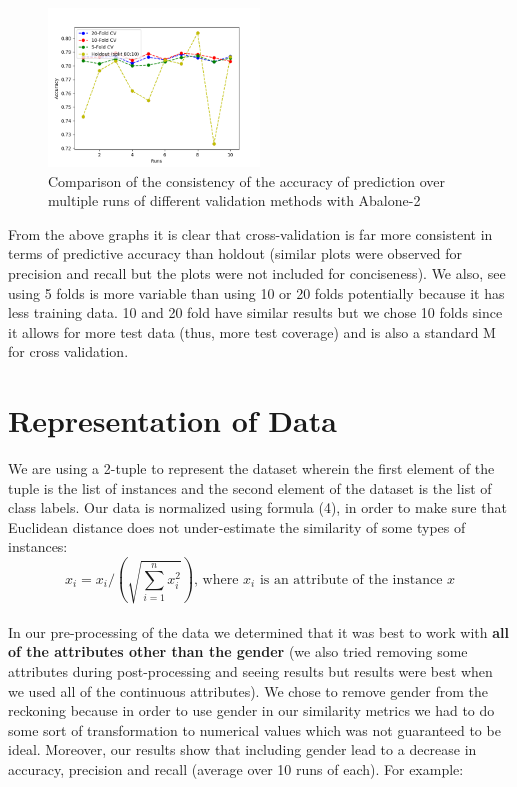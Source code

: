 \begin{figure}[!htb]
\centering

\includegraphics[width=0.5\textwidth]{consistency_comparison_2.png}
\caption{Comparison of the consistency of the accuracy of prediction over multiple runs of different validation methods with Abalone-2}
\end{figure}


From the above graphs it is clear that cross-validation is far more consistent in terms of predictive accuracy than holdout (similar plots were observed for precision and recall but the plots were not included for conciseness). We also, see using 5 folds is more variable than using 10 or 20 folds potentially because it has less training data. 10 and 20 fold have similar results but we chose 10 folds since it allows for more test data (thus, more test coverage) and is also a standard M for cross validation. 


\section{Representation of Data}

We are using a 2-tuple to represent the dataset wherein the first element of the tuple is the list of instances and the second element of the dataset is the list of class labels. Our data is normalized using formula (4), in order to make sure that Euclidean distance does not under-estimate the similarity of some types of instances:
\\
\begin{equation}
x_i = x_i/(\sqrt{\sum_{i=1}^{n} x_i^2}) \text{, where } x_i \text{ is an attribute of the instance } x
\end{equation}
\\
In our pre-processing of the data we determined that it was best to work with {\bf all of the attributes other than the gender} (we also tried removing some attributes during post-processing and seeing results but results were best when we used all of the continuous attributes). We chose to remove gender from the reckoning because in order to use gender in our similarity metrics we had to do some sort of transformation to numerical values which was not guaranteed to be ideal. Moreover, our results show that including gender lead to a decrease in accuracy, precision and recall (average over 10 runs of each). For example:


